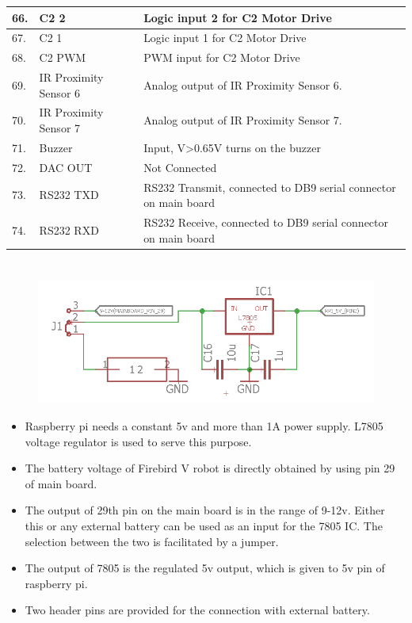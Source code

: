 \documentclass[a4paper,12pt,oneside]{book}
\begin{document}
\begin{tabular}{|p{2cm}|p{4cm}|p{10cm}|}
\hline
66. & C2 2 & Logic input 2 for C2 Motor Drive\\
\hline
67. & C2 1 & Logic input 1 for C2 Motor Drive\\
\hline
68. & C2 PWM & PWM input for C2 Motor Drive\\
\hline
69. &IR Proximity Sensor 6 &Analog output of IR Proximity Sensor 6. \\
\hline
70. &IR Proximity Sensor 7 &Analog output of IR Proximity Sensor 7. \\
\hline
71. &Buzzer &Input, V>0.65V turns on the buzzer \\
\hline
72. &DAC OUT &Not Connected \\
\hline
73. &RS232 TXD & RS232 Transmit, connected to DB9 serial connector on main board \\
\hline
74. &RS232 RXD & RS232 Receive, connected to DB9 serial connector on main board \\
\hline


 
\end{tabular}
\pagebreak 

\section*{\textbf{\fontsize{25}{10}\selectfont{3.Powering Raspberry Pi}}}
\begin{figure}[h]
	\includegraphics[width=1.\textwidth]{rpi_power}
\end{figure}
\hfill
\begin{itemize}
	\item{Raspberry pi needs a constant 5v and more than 1A power supply. L7805 voltage regulator is used to serve this purpose.}
	\item {The battery voltage of Firebird V robot is directly obtained by using pin 29 of main board.}
	\item {The output of 29th pin on the main board is in the range of 9-12v. Either this or any external battery can be used as an input for the 7805 IC. The selection between the two is facilitated by a jumper.}
	\item {The output of 7805 is the regulated 5v output, which is given to 5v pin of raspberry pi.}
	\item {Two header pins are provided for the connection with external battery.}
\end{itemize}
\pagebreak
\end{document}
